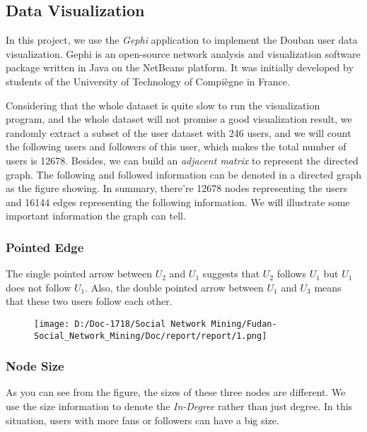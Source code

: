 \documentclass[]{article}
\date{}
\begin{document}
\hypertarget{header-n0}{%
\subsection{Data Visualization}\label{header-n0}}

In this project, we use the \emph{Gephi} application to implement the
Douban user data visualization. Gephi is an open-source network analysis
and visualization software package written in Java on the NetBeans
platform. It was initially developed by students of the University of
Technology of Compiègne in France.

Considering that the whole dataset is quite slow to run the
visualization program, and the whole dataset will not promise a good
visualization result, we randomly extract a subset of the user dataset
with 246 users, and we will count the following users and followers of
this user, which makes the total number of users is 12678. Besides, we
can build an \emph{adjacent matrix} to represent the directed graph. The
following and followed information can be denoted in a directed graph as
the figure showing. In summary, there're 12678 nodes representing the
users and 16144 edges representing the following information. We will
illustrate some important information the graph can tell.

\hypertarget{header-n6}{%
\subsubsection{Pointed Edge}\label{header-n6}}

The single pointed arrow between \(U_2\) and \(U_1\) suggests that
\(U_2\) follows \(U_1\) but \(U_1\) does not follow \(U_1\). Also, the
double pointed arrow between \(U_1\) and \(U_3\) means that these two
users follow each other.\\

\begin{figure}
\centering
\texttt{[image: D:/Doc-1718/Social Network Mining/Fudan-Social\_Network\_Mining/Doc/report/report/1.png]}
\caption{}
\end{figure}

\hypertarget{header-n13}{%
\subsubsection{Node Size}\label{header-n13}}

As you can see from the figure, the sizes of these three nodes are
different. We use the size information to denote the \emph{In-Degree}
rather than just degree. In this situation, users with more fans or
followers can have a big size.
\end{document}
